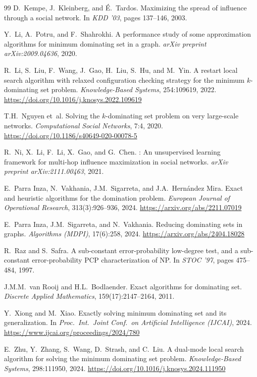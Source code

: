\documentclass[11pt,a4paper]{article}
\begin{document}
\begin{thebibliography}{99}
D.~Kempe, J.~Kleinberg, and \'{E}.~Tardos.
\newblock Maximizing the spread of influence through a social network.
\newblock In \emph{KDD '03}, pages 137--146, 2003.

Y.~Li, A.~Potru, and F.~Shahrokhi.
\newblock A performance study of some approximation algorithms for
  minimum dominating set in a graph.
\newblock \emph{arXiv preprint arXiv:2009.04636}, 2020.

R.~Li, S.~Liu, F.~Wang, J.~Gao, H.~Liu, S.~Hu, and M.~Yin.
\newblock A restart local search algorithm with relaxed configuration
  checking strategy for the minimum $k$-dominating set problem.
\newblock \emph{Knowledge-Based Systems}, 254:109619, 2022.
\newblock \url{https://doi.org/10.1016/j.knosys.2022.109619}

T.H.~Nguyen et~al.
\newblock Solving the $k$-dominating set problem on very large-scale
  networks.
\newblock \emph{Computational Social Networks}, 7:4, 2020.
\newblock \url{https://doi.org/10.1186/s40649-020-00078-5}

R.~Ni, X.~Li, F.~Li, X.~Gao, and G.~Chen.
: An unsupervised learning framework for
  multi-hop influence maximization in social networks.
\newblock \emph{arXiv preprint arXiv:2111.00463}, 2021.

E.~Parra Inza, N.~Vakhania, J.M.~Sigarreta, and J.A.~Hern{\'a}ndez Mira.
\newblock Exact and heuristic algorithms for the domination problem.
\newblock \emph{European Journal of Operational Research},
  313(3):926--936, 2024.
\newblock \url{https://arxiv.org/abs/2211.07019}

E.~Parra Inza, J.M.~Sigarreta, and N.~Vakhania.
\newblock Reducing dominating sets in graphs.
\newblock \emph{Algorithms (MDPI)}, 17(6):258, 2024.
\newblock \url{https://arxiv.org/abs/2404.18028}

R.~Raz and S.~Safra.
\newblock A sub-constant error-probability low-degree test, and a
  sub-constant error-probability {PCP} characterization of {NP}.
\newblock In \emph{STOC '97}, pages 475--484, 1997.

J.M.M.~van Rooij and H.L.~Bodlaender.
\newblock Exact algorithms for dominating set.
\newblock \emph{Discrete Applied Mathematics}, 159(17):2147--2164,
  2011.

Y.~Xiong and M.~Xiao.
\newblock Exactly solving minimum dominating set and its
  generalization.
\newblock In \emph{Proc.\ Int.\ Joint Conf.\ on Artificial Intelligence
  (IJCAI)}, 2024.
\newblock \url{https://www.ijcai.org/proceedings/2024/780}

E.~Zhu, Y.~Zhang, S.~Wang, D.~Strash, and C.~Liu.
\newblock A dual-mode local search algorithm for solving the minimum
  dominating set problem.
\newblock \emph{Knowledge-Based Systems}, 298:111950, 2024.
\newblock \url{https://doi.org/10.1016/j.knosys.2024.111950}

\end{thebibliography}
\end{document}
